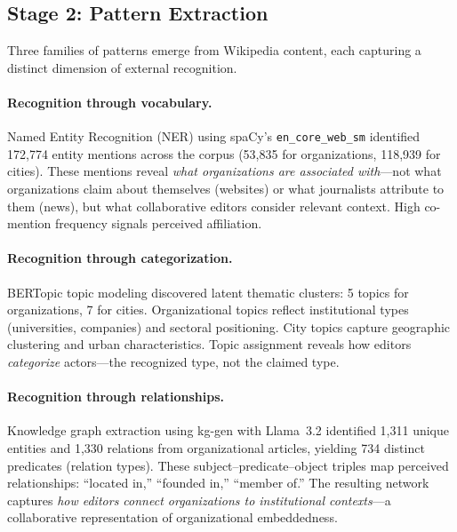 \documentclass[../main.tex]{subfiles}
\begin{document}
\subsection{Stage 2: Pattern Extraction}

Three families of patterns emerge from Wikipedia content, each capturing
a distinct dimension of external recognition.

\paragraph{Recognition through vocabulary.}
Named Entity Recognition (NER) using spaCy's \texttt{en\_core\_web\_sm}
identified 172,774 entity mentions across the corpus (53,835 for organizations,
118,939 for cities).
These mentions reveal \emph{what organizations are associated with}---not
what organizations claim about themselves (websites) or what journalists
attribute to them (news), but what collaborative editors consider relevant
context.
High co-mention frequency signals perceived affiliation.

\paragraph{Recognition through categorization.}
BERTopic topic modeling discovered latent thematic clusters: 5 topics for
organizations, 7 for cities.
Organizational topics reflect institutional types (universities, companies)
and sectoral positioning.
City topics capture geographic clustering and urban characteristics.
Topic assignment reveals how editors \emph{categorize} actors---the
recognized type, not the claimed type.

\paragraph{Recognition through relationships.}
Knowledge graph extraction using kg-gen with Llama~3.2 identified 1,311
unique entities and 1,330 relations from organizational articles, yielding
734 distinct predicates (relation types).
These subject--predicate--object triples map perceived relationships:
``located in,'' ``founded in,'' ``member of.''
The resulting network captures \emph{how editors connect organizations
to institutional contexts}---a collaborative representation of organizational
embeddedness.
\end{document}

